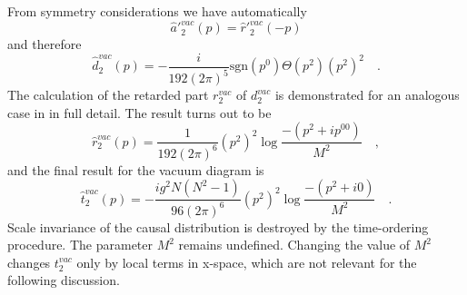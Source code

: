 \documentclass[a4paper,11pt]{article}
\begin{document}
From symmetry considerations we have automatically
\begin{equation}
\hat{a}'^{vac}_2(p)=\hat{r}'^{vac}_2(-p)
\end{equation}
and therefore
\begin{equation}
\hat{d}^{vac}_2(p)=-\frac{i}{192 (2 \pi)^5} \mbox{sgn}(p^0) \Theta(p^2) (p^2)^2 
\quad .
\end{equation}
The calculation of the retarded part $r^{vac}_2$ of $d^{vac}_2$ is demonstrated
for an analogous case in \cite{ym2} in full detail.
The result turns out to be
\begin{equation}
\hat{r}^{vac}_2(p)=\frac{1}{192 (2 \pi)^6} (p^2)^2
\log \frac{-(p^2+ip^00)}{M^2}
\quad ,
\end{equation}
and the final result for the vacuum diagram is
\begin{equation}
\hat{t}^{vac}_2(p)=-\frac{ig^2N(N^2-1)}{96 (2 \pi)^6} (p^2)^2 \log
\frac{-(p^2+i0)}{M^2}
\quad .
\end{equation}
Scale invariance of the causal distribution is destroyed by the
time-ordering procedure.
The parameter $M^2$ remains undefined. Changing the value of $M^2$ changes
$t^{vac}_2$ only by local terms in x-space,
which are not relevant for the following discussion.
\end{document}
